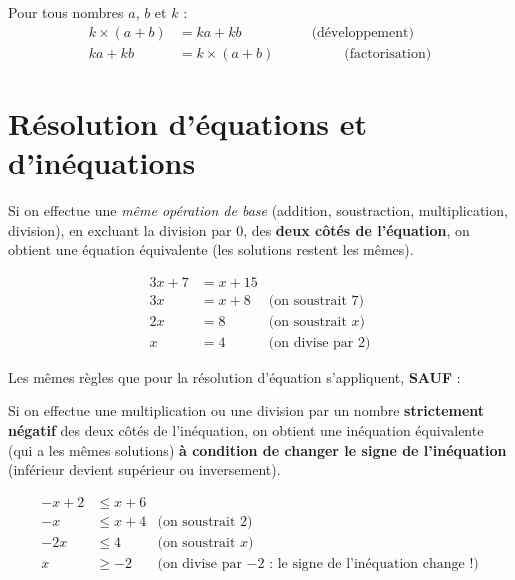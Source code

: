 \documentclass[
	10pt,
	classe=$2^{de}$,
]{coursclass}
\begin{document}
\begin{propriete}
	Pour tous nombres $a$, $b$ et $k$ :
	\begin{align*}
		k × (a + b) & = ka + kb \hspace{5em}\text{(développement)}     \\
		ka + kb     & = k × (a + b) \hspace{5em}\text{(factorisation)}
	\end{align*}
\end{propriete}

\section{Résolution d’équations et d’inéquations}

\begin{propriete}
	Si on effectue une \textit{même opération de base} (addition, soustraction, multiplication, division), en excluant la division par $0$, des \textbf{deux côtés de l'équation}, on obtient une équation équivalente (les solutions restent les mêmes).
\end{propriete}

\begin{exemple}
	\begin{align*}
		3x + 7 & = x + 15 &                           \\
		3x     & = x + 8  & \text{(on soustrait 7)}   \\
		2x     & = 8      & \text{(on soustrait $x$)} \\
		x      & = 4      & \text{(on divise par 2)}
	\end{align*}
\end{exemple}

\begin{propriete}
	Les mêmes règles que pour la résolution d'équation s'appliquent, \textbf{SAUF} :

	Si on effectue une multiplication ou une division par un nombre \textbf{strictement négatif} des deux côtés de l’inéquation, on obtient une inéquation équivalente (qui a les mêmes solutions) \textbf{à condition de changer le signe de l’inéquation} (inférieur devient supérieur ou inversement).
\end{propriete}

\begin{exemple}
	\begin{align*}
		-x + 2 & ≤ x + 6 &                                                                 \\
		-x     & ≤ x + 4 & \text{(on soustrait 2)}                                         \\
		-2x    & ≤ 4     & \text{(on soustrait $x$)}                                       \\
		x      & ≥ -2    & \text{(on divise par $-2$ : le signe de l'inéquation change !)} \\
	\end{align*}
\end{exemple}
\end{document}
